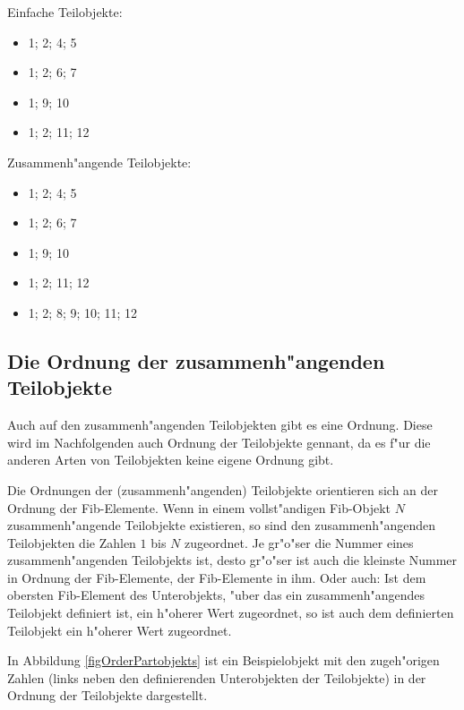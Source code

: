 Einfache Teilobjekte:
\begin{itemize}
 \item 1; 2; 4; 5
 \item 1; 2; 6; 7
 \item 1; 9; 10
 \item 1; 2; 11; 12
\end{itemize}

Zusammenh"angende Teilobjekte:
\begin{itemize}
 \item 1; 2; 4; 5
 \item 1; 2; 6; 7
 \item 1; 9; 10
 \item 1; 2; 11; 12
 \item 1; 2; 8; 9; 10; 11; 12
\end{itemize}


\subsection{Die Ordnung der zusammenh"angenden Teilobjekte}
\label{secOrderPartobjects}

Auch auf den zusammenh"angenden Teilobjekten gibt es eine Ordnung. Diese wird im Nachfolgenden auch Ordnung der Teilobjekte gennant, da es f"ur die anderen Arten von Teilobjekten keine eigene Ordnung gibt.

Die Ordnungen der (zusammenh"angenden) Teilobjekte orientieren sich an der Ordnung der Fib-Elemente. Wenn in einem vollst"andigen Fib-Objekt $N$ zusammenh"angende Teilobjekte existieren, so sind den zusammenh"angenden Teilobjekten die Zahlen $1$ bis $N$ zugeordnet.
Je gr"o"ser die Nummer eines zusammenh"angenden Teilobjekts ist, desto gr"o"ser ist auch die kleinste Nummer in Ordnung der Fib-Elemente, der Fib-Elemente in ihm.
Oder auch: Ist dem obersten Fib-Element des Unterobjekts, "uber das ein zusammenh"angendes Teilobjekt definiert ist, ein h"oherer Wert zugeordnet, so ist auch dem definierten Teilobjekt ein h"oherer Wert zugeordnet.

In Abbildung \ref{figOrderPartobjekts} ist ein Beispielobjekt mit den zugeh"origen Zahlen (links neben den definierenden Unterobjekten der Teilobjekte) in der Ordnung der Teilobjekte dargestellt.

